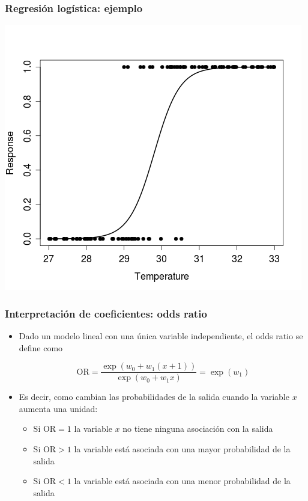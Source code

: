 \documentclass{beamer}
\begin{document}
\begin{frame}
\frametitle{Regresión logística: ejemplo}
\centering
\includegraphics[height=0.85\textheight]{log_reg.png}
\end{frame}


\begin{frame}
\frametitle{Interpretación de coeficientes: odds ratio}
\begin{itemize}
\item Dado un modelo lineal con una única variable independiente, el odds ratio se define como

$$\text{OR} = \frac{\exp(w_0 + w_1(x+1))}{\exp(w_0 + w_1x)} = \exp(w_1)$$

\item Es decir, como cambian las probabilidades de la salida cuando la variable $x$ aumenta una unidad:
\begin{itemize}
\item Si $\text{OR}=1$ la variable $x$ no tiene ninguna asociación con la salida
\item Si $\text{OR}>1$ la variable está asociada con una mayor probabilidad de la salida
\item Si $\text{OR}<1$ la variable está asociada con una menor probabilidad de la salida
\end{itemize}
\end{itemize}
\end{frame}
\end{document}
